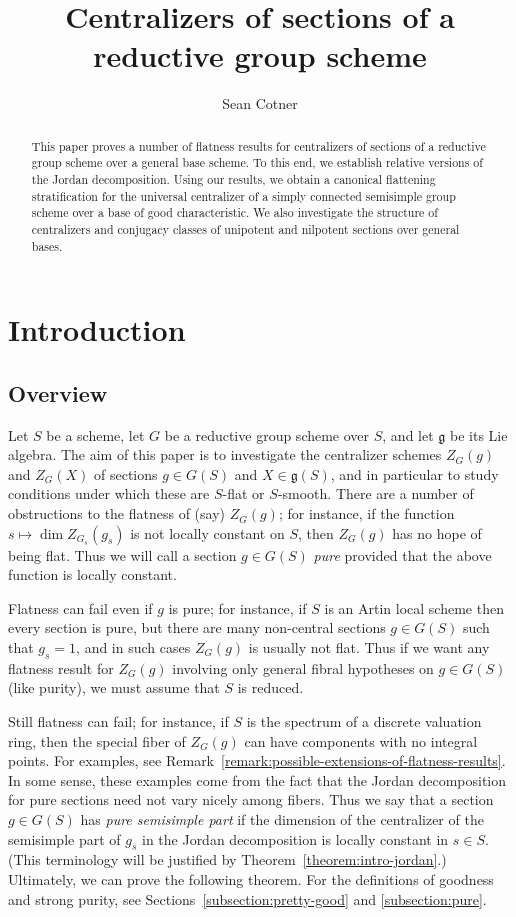 \documentclass[11pt,reqno]{amsart}
\title{Centralizers of sections of a reductive group scheme}
\author{Sean Cotner}
\theoremstyle{definition}
\newcommand{\fg}{\mathfrak{g}}
\begin{document}

\maketitle

\begin{abstract}
This paper proves a number of flatness results for centralizers of sections of a reductive group scheme over a general base scheme. To this end, we establish relative versions of the Jordan decomposition. Using our results, we obtain a canonical flattening stratification for the universal centralizer of a simply connected semisimple group scheme over a base of good characteristic. We also investigate the structure of centralizers and conjugacy classes of unipotent and nilpotent sections over general bases.
\end{abstract}

\section{Introduction}

\subsection{Overview}

Let $S$ be a scheme, let $G$ be a reductive group scheme over $S$, and let $\fg$ be its Lie algebra. The aim of this paper is to investigate the centralizer schemes $Z_G(g)$ and $Z_G(X)$ of sections $g \in G(S)$ and $X \in \fg(S)$, and in particular to study conditions under which these are $S$-flat or $S$-smooth. There are a number of obstructions to the flatness of (say) $Z_G(g)$; for instance, if the function $s \mapsto \dim Z_{G_s}(g_s)$ is not locally constant on $S$, then $Z_G(g)$ has no hope of being flat. Thus we will call a section $g \in G(S)$ \textit{pure} provided that the above function is locally constant. \smallskip

Flatness can fail even if $g$ is pure; for instance, if $S$ is an Artin local scheme then every section is pure, but there are many non-central sections $g \in G(S)$ such that $g_s = 1$, and in such cases $Z_G(g)$ is usually not flat. Thus if we want any flatness result for $Z_G(g)$ involving only general fibral hypotheses on $g \in G(S)$ (like purity), we must assume that $S$ is reduced.\smallskip

Still flatness can fail; for instance, if $S$ is the spectrum of a discrete valuation ring, then the special fiber of $Z_G(g)$ can have components with no integral points. For examples, see Remark~\ref{remark:possible-extensions-of-flatness-results}. In some sense, these examples come from the fact that the Jordan decomposition for pure sections need not vary nicely among fibers. Thus we say that a section $g \in G(S)$ has \textit{pure semisimple part} if the dimension of the centralizer of the semisimple part of $g_{\overline{s}}$ in the Jordan decomposition is locally constant in $s \in S$. (This terminology will be justified by Theorem~\ref{theorem:intro-jordan}.) Ultimately, we can prove the following theorem. For the definitions of goodness and strong purity, see Sections~\ref{subsection:pretty-good} and \ref{subsection:pure}.
\end{document}

